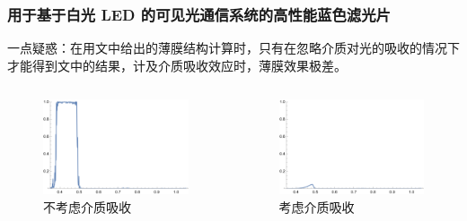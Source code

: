 \begin{frame}[c]
    \frametitle{用于基于白光 LED 的可见光通信系统的高性能蓝色滤光片}
    一点疑惑：在用文中给出的薄膜结构计算时，只有在忽略介质对光的吸收的情况下才能得到文中的结果，计及介质吸收效应时，薄膜效果极差。
    \begin{columns}
        \begin{column}{.5\textwidth}
            \begin{figure}[H] %
                \centering %
                \includegraphics[width=1.\textwidth]{figures/A high-performance blue filter for a white-led-based visible light communication system_3.png} %
                \caption{不考虑介质吸收} %
            \end{figure}
        \end{column}
        \begin{column}{.5\textwidth}
            \begin{figure}[H] %
                \centering %
                \includegraphics[width=1.\textwidth]{figures/A high-performance blue filter for a white-led-based visible light communication system_4.png} %
                \caption{考虑介质吸收} %
            \end{figure}
        \end{column}
    \end{columns}
\end{frame}